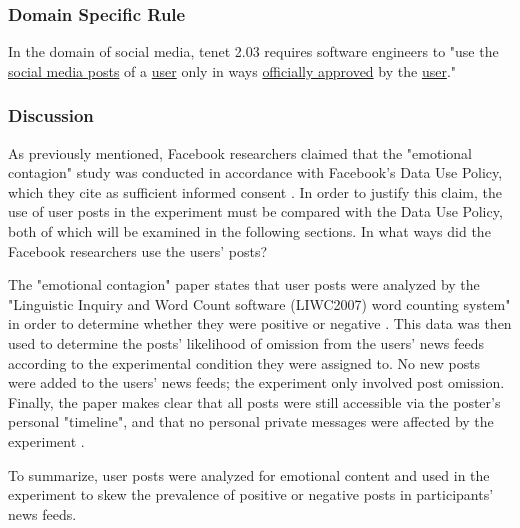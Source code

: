 \subsubsection{Domain Specific Rule}
In the domain of social media, tenet 2.03 requires software engineers to
"use the \uline{social media posts} of a \uline{user} only in ways \uline{officially approved} by the \uline{user}."

\subsubsection{Discussion}
As previously mentioned, Facebook researchers claimed that the "emotional contagion" study was conducted in accordance with Facebook's Data Use Policy, which they cite as sufficient informed consent \cite{study}.  In order to justify this claim, the use of user posts in the experiment must be compared with the Data Use Policy, both of which will be examined in the following sections.
In what ways did the Facebook researchers use the users' posts? \par 
The "emotional contagion" paper states that user posts were analyzed by the "Linguistic Inquiry and Word Count software (LIWC2007) word counting system" in order to determine whether they were positive or negative \cite{study}.  This data was then used to determine the posts' likelihood of omission from the users' news feeds according to the experimental condition they were assigned to.  No new posts were added to the users' news feeds;  the experiment only involved post omission.  Finally, the paper makes clear that all posts were still accessible via the poster's personal "timeline", and that no personal private messages were affected by the experiment \cite{study}. \par 
To summarize, user posts were analyzed for emotional content and used in the experiment to skew the prevalence of positive or negative posts in participants' news feeds.


